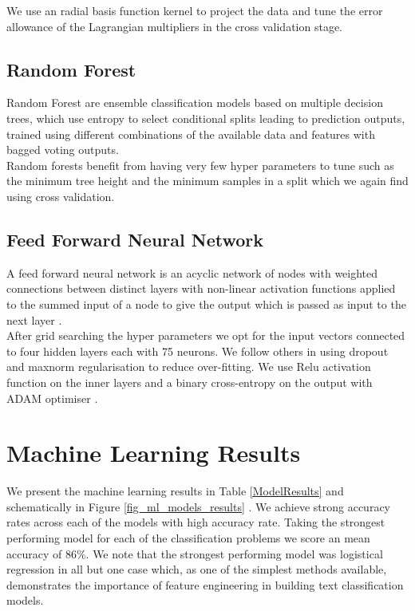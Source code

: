 \documentclass[sigconf, nonacm]{acmart}
\begin{document}
We use an radial basis function kernel to project the data and tune the error allowance of the Lagrangian multipliers in the cross validation stage. 

\subsection{Random Forest}
Random Forest \cite{breiman2001random} are ensemble classification models based on multiple decision trees, which use entropy to select conditional splits leading to prediction outputs, trained using different combinations of the available data and features with bagged voting outputs.  \\

Random forests benefit from having very few hyper parameters to tune such as the minimum tree height and the minimum samples in a split
which we again find using cross validation. 

\subsection{Feed Forward Neural Network}

A feed forward neural network is an acyclic network of nodes with weighted connections between distinct layers with non-linear activation functions applied to the summed input of a node to give the output which is passed as input to the next layer \cite{lippmann1987introduction}. \\

After grid searching the hyper parameters we opt for the input vectors connected to four hidden layers each with 75 neurons. We follow others in using dropout and maxnorm regularisation \cite{srivastava2014dropout} to reduce over-fitting. We use Relu activation function on the inner layers and a binary cross-entropy on the output with ADAM optimiser \cite{kingma2014adam}. 


\section{Machine Learning Results}

We present the machine learning results in Table \ref{ModelResults} and schematically in Figure \ref{fig_ml_models_results} . We achieve strong accuracy rates across each of the models with high accuracy rate. Taking the strongest performing model for each of the classification problems we score an mean accuracy of 86\%. We note that the strongest performing model was logistical regression in all but one case which, as one of the simplest methods available, demonstrates the importance of feature engineering in building text classification models. \\
\end{document}

